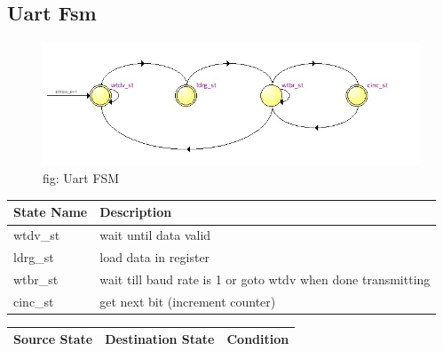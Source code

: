 \documentclass[12pt,a4 paper] {report}
\begin{document}
\newpage

\subsection{Uart Fsm}
\begin{figure}[h]
	\centering	
	\includegraphics[scale=0.5]{../png/Uart.png}
	\newline
	fig: Uart FSM\\
\end{figure}
\begin{center}
 \begin{tabular}{| p{4cm} | p{7cm} |}
	 \hline
	 State Name & Description \\
	 \hline
	 wtdv\_st & wait until data valid \\
	 \hline
	 ldrg\_st & load data in register \\
	 \hline
	 wtbr\_st & wait till baud rate is 1 or goto wtdv when done transmitting \\
	 \hline
	 cinc\_st & get next bit (increment counter) \\
	 \hline
 \end{tabular}
\end{center}
\begin{center}
	\begin{tabular}{| p{2cm} | p{2cm} | p{11cm} |}
		\hline
		Source State& Destination State & Condition \\
		\hline	
		
		
	\end{tabular}	
\end{center}

\newpage
\end{document}
